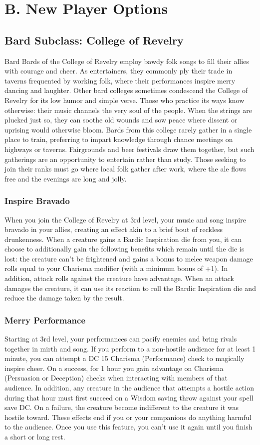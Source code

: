 \documentclass[10pt,a4paper,twoside,twocolumn,openany,bg=print,nodeprecatedcode]{dndbook}
\begin{document}
\section{B. New Player Options}
\subsection{Bard Subclass: College of Revelry}
Bard
Bards of the College of Revelry employ bawdy folk songs to fill their allies with courage and cheer. As entertainers, they commonly ply their trade in taverns frequented by working folk, where their performances inspire merry dancing and laughter.
Other bard colleges sometimes condescend the College of Revelry for its low humor and simple verse. Those who practice its ways know otherwise: their music channels the very soul of the people. When the strings are plucked just so, they can soothe old wounds and sow peace where dissent or uprising would otherwise bloom.
Bards from this college rarely gather in a single place to train, preferring to impart knowledge through chance meetings on highways or taverns. Fairgrounds and beer festivals draw them together, but such gatherings are an opportunity to entertain rather than study. Those seeking to join their ranks must go where local folk gather after work, where the ale flows free and the evenings are long and jolly.
\subsubsection{Inspire Bravado}
When you join the College of Revelry at 3rd level, your music and song inspire bravado in your allies, creating an effect akin to a brief bout of reckless drunkenness.
When a creature gains a Bardic Inspiration die from you, it can choose to additionally gain the following benefits which remain until the die is lost: the creature can't be frightened and gains a bonus to melee weapon damage rolls equal to your Charisma modifier (with a minimum bonus of +1). In addition, attack rolls against the creature have advantage. When an attack damages the creature, it can use its reaction to roll the Bardic Inspiration die and reduce the damage taken by the result.
\subsubsection{Merry Performance}
Starting at 3rd level, your performances can pacify enemies and bring rivals together in mirth and song.
If you perform to a non-hostile audience for at least 1 minute, you can attempt a DC 15 Charisma (Performance) check to magically inspire cheer. On a success, for 1 hour you gain advantage on Charisma (Persuasion or Deception) checks when interacting with members of that audience. In addition, any creature in the audience that attempts a hostile action during that hour must first succeed on a Wisdom saving throw against your spell save DC. On a failure, the creature become indifferent to the creature it was hostile toward. These effects end if you or your companions do anything harmful to the audience.
Once you use this feature, you can't use it again until you finish a short or long rest.
\end{document}
